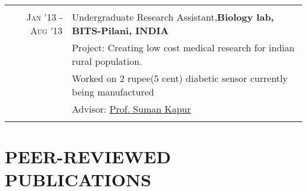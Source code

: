 \documentclass[7pt]{article}
\begin{document}
\begin{small}
\begin{tabular}{rl}
  \vspace{-2 mm}
&\\


 \textsc{Jan '13 - Aug '13 } &  Undergraduate Research Assistant,\bf{Biology lab, BITS-Pilani, INDIA}\\
 & Project: Creating low cost medical research for indian rural population. \\ & Worked on 2 rupee(5 cent) diabetic sensor currently being manufactured\\
&\normalsize \small Advisor: 
\href{http://www.bits-pilani.ac.in/Hyderabad/sumankapur/Profile} {Prof. Suman Kapur}\\&\\

\end{tabular}

\vspace{-4 mm}

\section{PEER-REVIEWED PUBLICATIONS} 



\end{small}
\end{document}
